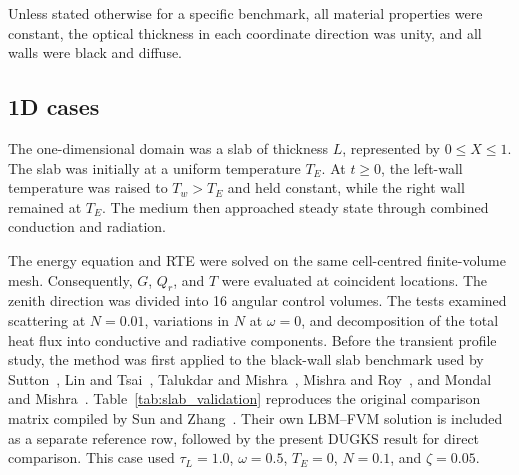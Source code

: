 \documentclass[a4paper,12pt]{ctexart}
\numberwithin{equation}{section}
\begin{document}
Unless stated otherwise for a specific benchmark, all material properties were constant, the optical thickness in each coordinate direction was unity, and all walls were black and diffuse.

\subsection{1D cases}
\label{subsec:1d_cases}

The one-dimensional domain was a slab of thickness $L$, represented by $0\leq X\leq 1$. The slab was initially at a uniform temperature $T_E$. At $t\geq0$, the left-wall temperature was raised to $T_w>T_E$ and held constant, while the right wall remained at $T_E$. The medium then approached steady state through combined conduction and radiation.

The energy equation and RTE were solved on the same cell-centred finite-volume mesh. Consequently, $G$, $Q_r$, and $T$ were evaluated at coincident locations. The zenith direction was divided into 16 angular control volumes. The tests examined scattering at $N=0.01$, variations in $N$ at $\omega=0$, and decomposition of the total heat flux into conductive and radiative components. Before the transient profile study, the method was first applied to the black-wall slab benchmark used by Sutton~\cite{Sutton1986}, Lin and Tsai~\cite{LinTsai1990}, Talukdar and Mishra~\cite{Talukdar2001}, Mishra and Roy~\cite{MishraRoy2007}, and Mondal and Mishra~\cite{MondalMishra2007}. Table~\ref{tab:slab_validation} reproduces the original comparison matrix compiled by Sun and Zhang~\cite{Sun2016}. Their own LBM--FVM solution is included as a separate reference row, followed by the present DUGKS result for direct comparison. This case used $\tau_L=1.0$, $\omega=0.5$, $T_E=0$, $N=0.1$, and $\zeta=0.05$.
\end{document}
